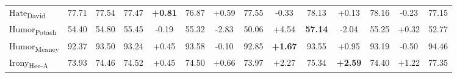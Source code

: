 \begin{table*}[ht]
\begin{tabular}{@{}lcc:cc:cc:cc:cc:cc|c@{}}
Hate\textsubscript{David}    & 77.71         &     77.54                       & 77.47                                   & \colorbox{green!10}{\textbf{+0.81}}                                & 76.87                                   & +0.59                                & 77.55                                   & -0.33                                & \colorbox{green!10}{78.13}                                   & \colorbox{green!10}{+0.13}                                & \colorbox{green!10}{78.16}                                   & \colorbox{green!10}{-0.23}           &   77.15                     \\

Humor\textsubscript{Potash}  & 54.40              &   \colorbox{green!10}{54.80}                  & \colorbox{green!10}{55.45}                                   & \colorbox{green!10}{-0.19}                                & \colorbox{green!10}{55.32}                                   & -2.83                                & 50.06                                   & \colorbox{green!10}{+4.54}                                & \colorbox{green!10}{\textbf{57.14}}                                   & \colorbox{green!10}{-2.04}                                & \colorbox{green!10}{55.25}                                   & \colorbox{green!10}{+0.32}             &    52.77                   \\

Humor\textsubscript{Meaney}  & 92.37                &        \colorbox{green!10}{93.50}        & \colorbox{green!10}{93.24}                                   & \colorbox{green!10}{+0.45}                                & \colorbox{green!10}{93.58}                                   & \colorbox{green!10}{-0.10}                                & \colorbox{green!10}{92.85}                                   & \colorbox{green!10}{\textbf{+1.67}}                                & \colorbox{green!10}{93.55}                                   & \colorbox{green!10}{+0.95}                                & \colorbox{green!10}{93.19}                                   & \colorbox{green!10}{-0.50}                & 94.46                \\

Irony\textsubscript{Hee-A}    & 73.93                    &      \colorbox{green!10}{74.46}      & \colorbox{green!10}{74.52}                                   & \colorbox{green!10}{+0.45}                                & \colorbox{green!10}{74.50}                                    & \colorbox{green!10}{+0.66}                                & \colorbox{green!10}{73.97}                                   & \colorbox{green!10}{+2.27}                                & \colorbox{green!10}{75.34}                                   & \colorbox{green!10}{\textbf{+2.59}}                                & \colorbox{green!10}{74.40}                                   & \colorbox{green!10}{+1.22}               &   77.35                 \\


\end{tabular}
\end{table*}
